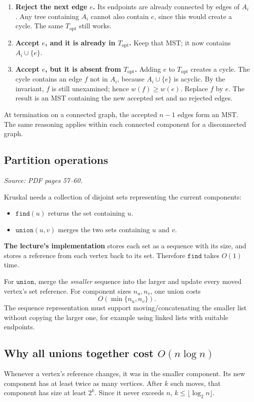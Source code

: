 \documentclass[11pt,letterpaper]{article}
\newcommand{\sourcepages}[1]{\textit{Source: PDF pages #1.}}
\newcommand{\method}[1]{\texttt{#1}}
\begin{document}
\begin{enumerate}
 \item \textbf{Reject the next edge $e$.} Its endpoints are already connected by edges of $A_i$. Any tree containing $A_i$ cannot also contain $e$, since this would create a cycle. The same $T_{\mathrm{opt}}$ still works.
 \item \textbf{Accept $e$, and it is already in $T_{\mathrm{opt}}$.} Keep that MST; it now contains $A_i\cup\{e\}$.
 \item \textbf{Accept $e$, but it is absent from $T_{\mathrm{opt}}$.} Adding $e$ to $T_{\mathrm{opt}}$ creates a cycle. The cycle contains an edge $f$ not in $A_i$, because $A_i\cup\{e\}$ is acyclic. By the invariant, $f$ is still unexamined; hence $w(f)\geq w(e)$. Replace $f$ by $e$. The result is an MST containing the new accepted set and no rejected edges.
\end{enumerate}
At termination on a connected graph, the accepted $n-1$ edges form an MST. The same reasoning applies within each connected component for a disconnected graph.

\subsection{Partition operations}
\sourcepages{57--60}

Kruskal needs a collection of disjoint sets representing the current components:
\begin{itemize}
 \item $\method{find}(u)$ returns the set containing $u$.
 \item $\method{union}(u,v)$ merges the two sets containing $u$ and $v$.
\end{itemize}
\textbf{The lecture's implementation} stores each set as a sequence with its size, and stores a reference from each vertex back to its set. Therefore $\method{find}$ takes $O(1)$ time.

For $\method{union}$, merge the \emph{smaller} sequence into the larger and update every moved vertex's set reference. For component sizes $n_u,n_v$, one union costs
\[
 O(\min\{n_u,n_v\}).
\]
The sequence representation must support moving/concatenating the smaller list without copying the larger one, for example using linked lists with suitable endpoints.

\subsection{Why all unions together cost \texorpdfstring{$O(n\log n)$}{O(n log n)}}
Whenever a vertex's reference changes, it was in the smaller component. Its new component has at least twice as many vertices. After $k$ such moves, that component has size at least $2^k$. Since it never exceeds $n$, $k\leq\lfloor\log_2 n\rfloor$.
\end{document}
